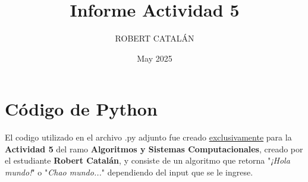 \documentclass{article}
\title{Informe Actividad 5}
\author{ROBERT CATALÁN}
\date{May 2025}
\begin{document}
\maketitle

\section{Código de Python}
El codigo utilizado en el archivo .py adjunto fue creado \underline{exclusivamente} para la \textbf{Actividad 5} del ramo \textbf{Algoritmos y Sistemas Computacionales}, creado por el estudiante \textbf{Robert Catalán}, y consiste de un algoritmo que retorna "\textit{¡Hola mundo!}" o "\textit{Chao mundo...}" dependiendo del input que se le ingrese.
\end{document}
